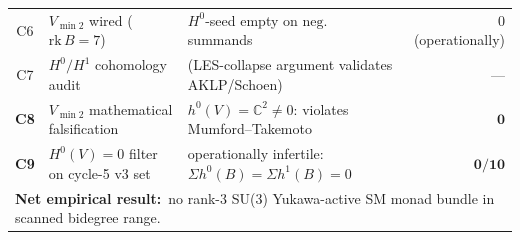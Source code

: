 \begin{table}[t]
\begin{ruledtabular}
\begin{tabular}{cllr}
C6 & $V_{\min 2}$ wired ($\mathrm{rk}\,B = 7$)                & $H^0$-seed empty on $\mathrm{neg}$. summands & $0$ (operationally) \\
C7 & $H^0/H^1$ cohomology audit                              & (LES-collapse argument validates AKLP/Schoen) & --- \\
\textbf{C8} & $V_{\min 2}$ mathematical falsification                  & $h^0(V) = \mathbb{C}^2 \neq 0$: violates Mumford--Takemoto & $\mathbf{0}$ \\
\textbf{C9} & $H^0(V) = 0$ filter on cycle-5 v3 set                  & operationally infertile: $\Sigma h^0(B) = \Sigma h^1(B) = 0$ & $\mathbf{0/10}$ \\
\hline
\multicolumn{4}{l}{\textbf{Net empirical result:}\ no rank-3 SU(3) Yukawa-active SM monad bundle in scanned bidegree range.} \\
\end{tabular}
\end{ruledtabular}
\end{table}
